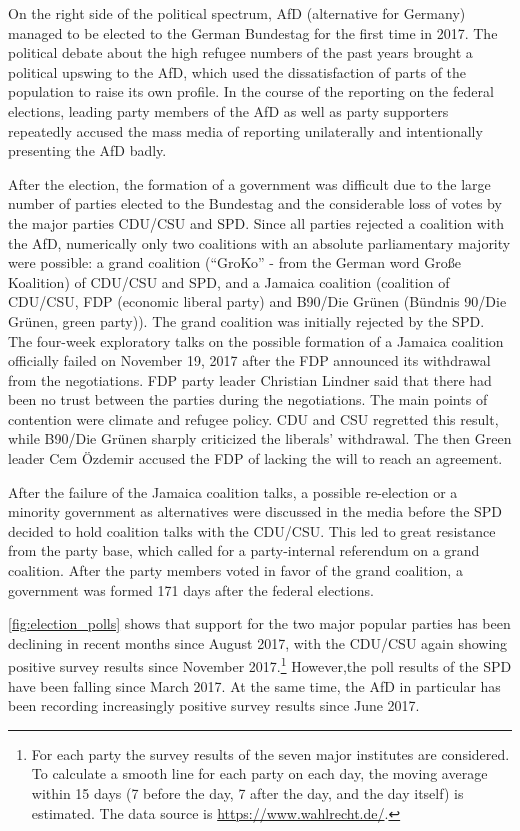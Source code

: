 \documentclass[
]{article}
\begin{document}
On the right side of the political spectrum, AfD (alternative for
Germany) managed to be elected to the German Bundestag for the first
time in 2017. The political debate about the high refugee numbers of the
past years brought a political upswing to the AfD, which used the
dissatisfaction of parts of the population to raise its own profile. In
the course of the reporting on the federal elections, leading party
members of the AfD as well as party supporters repeatedly accused the
mass media of reporting unilaterally and intentionally presenting the
AfD badly.

After the election, the formation of a government was difficult due to
the large number of parties elected to the Bundestag and the
considerable loss of votes by the major parties CDU/CSU and SPD. Since
all parties rejected a coalition with the AfD, numerically only two
coalitions with an absolute parliamentary majority were possible: a
grand coalition (``GroKo'' - from the German word Große Koalition) of
CDU/CSU and SPD, and a Jamaica coalition (coalition of CDU/CSU, FDP
(economic liberal party) and B90/Die Grünen (Bündnis 90/Die Grünen,
green party)). The grand coalition was initially rejected by the SPD.
The four-week exploratory talks on the possible formation of a Jamaica
coalition officially failed on November 19, 2017 after the FDP announced
its withdrawal from the negotiations. FDP party leader Christian Lindner
said that there had been no trust between the parties during the
negotiations. The main points of contention were climate and refugee
policy. CDU and CSU regretted this result, while B90/Die Grünen sharply
criticized the liberals' withdrawal. The then Green leader Cem Özdemir
accused the FDP of lacking the will to reach an agreement.

After the failure of the Jamaica coalition talks, a possible re-election
or a minority government as alternatives were discussed in the media
before the SPD decided to hold coalition talks with the CDU/CSU. This
led to great resistance from the party base, which called for a
party-internal referendum on a grand coalition. After the party members
voted in favor of the grand coalition, a government was formed 171 days
after the federal elections.

\autoref{fig:election_polls} shows that support for the two major
popular parties has been declining in recent months since August 2017,
with the CDU/CSU again showing positive survey results since November
2017.\footnote{For each party the survey results of the seven major
  institutes are considered. To calculate a smooth line for each party
  on each day, the moving average within 15 days (7 before the day, 7
  after the day, and the day itself) is estimated. The data source is
  \url{https://www.wahlrecht.de/}.} However,the poll results of the SPD
have been falling since March 2017. At the same time, the AfD in
particular has been recording increasingly positive survey results since
June 2017.
\end{document}
